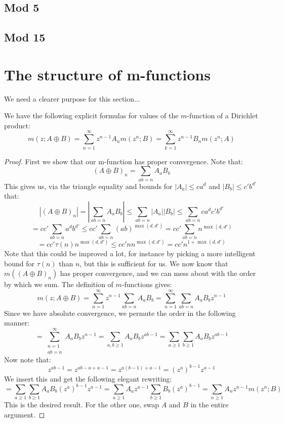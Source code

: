 \documentclass[a4paper]{amsart}
\begin{document}
\subsection{Mod 5}


\subsection{Mod 15}

\section{The structure of m-functions}
We need a clearer purpose for this section...
\begin{theorem}
We have the following explicit formulas for values of the $m$-function of a Dirichlet product:
  $$m(z; A \oplus B) = \sum_{n = 1}^\infty z^{n - 1} A_n m(z^n; B) = \sum_{k = 1}^\infty z^{n - 1} B_n m(z^n; A)$$
\end{theorem}


\begin{proof}
  First we show that our m-function has proper convergence. Note that:
  $$(A \oplus B)_n = \sum_{ab = n} A_a B_b$$
  This gives us, via the triangle equality and bounds for $|A_a| \le c a^d$ and $|B_b| \le c' b^{d'}$ that:
  $$|(A \oplus B)_n| = \left|\sum_{ab = n} A_a B_b\right| \le \sum_{ab = n} |A_a| |B_b| \le \sum_{ab = n} c a^d c' b^{d'} $$
  $$ = cc' \sum_{ab = n} a^d b^{d'} \le cc' \sum_{ab = n} (ab)^{\max(d, d')} = cc' \sum_{ab = n} n^{\max(d, d')} $$
  $$ = cc' \tau(n) n^{\max(d, d')} \le cc' n n^{\max(d, d')} = cc' n^{1 + \max(d, d')}$$
  Note that this could be improved a lot, for instance by picking a more intelligent bound for $\tau(n)$ than $n$, but this is sufficient for us. We now know that $m((A \oplus B)_n)$ has proper convergence, and we can mess about with the order by which we sum. The definition of $m$-functions gives:
  $$m(z; A \oplus B) = \sum_{n = 1}^\infty z^{n - 1} \sum_{ab = n} A_a B_b = \sum_{n = 1}^\infty \sum_{ab = n} A_a B_b z^{n - 1}$$
  Since we have absolute convergence, we permute the order in the following manner:
  $$ = \sum_{\substack{n = 1\\ ab = n}}^\infty A_a B_b z^{n - 1} = \sum_{a, b \ge 1} A_a B_b z^{ab - 1} = \sum_{a \ge 1} \sum_{b \ge 1} A_a B_b z^{ab - 1}$$
  Now note that:
  $$z^{ab - 1} = z^{ab - a + a - 1} = z^{a(b - 1) + a - 1} = (z^a)^{b - 1} z^{a - 1}$$
  We insert this and get the following elegant rewriting:
  $$ = \sum_{a \ge 1} \sum_{b \ge 1} A_a B_b (z^a)^{b - 1} z^{a - 1} = \sum_{a \ge 1} A_a z^{a - 1} \sum_{b \ge 1} B_b (z^a)^{b - 1} = \sum_{n \ge 1} A_n z^{n - 1} m(z^n; B)$$
  This is the desired result. For the other one, swap $A$ and $B$ in the entire argument. 
  
\end{proof}
\end{document}
